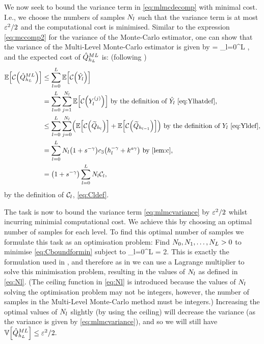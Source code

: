 We now seek to bound the variance term in \cref{eq:mlmcdecomp} with minimal cost. I.e., we choose the numbers of samples $N_{l}$ such that the variance term is at most $\varepsilon^2/2$ and the computational cost is minimised. Similar to the expression \cref{eq:mccomp2} for the variance of the Monte-Carlo estimator, one can show that the variance of the Multi-Level Monte-Carlo estimator is given by
\beq\label{eq:mlmcvariance}
\VAR{\QhatMLhL} = \sum_{l=0}^L \frac{\Vl}{\Nl},
\eeq
and the expected cost of $\hat{Q}^{ML}_{h_{L}}$ is: (following \cite{GrPaSc:19})
\begin{align}
\EXP{\Cost{\QhatMLhL}}&\leq \sum_{l=0}^L \EXP{\Cost{\Ylhat}}\nonumber\\
&= \sum_{l=0}^L \sum_{j=1}^{\Nl} \EXP{\Cost{\Ylj}}\text{ by the definition of } \Ylhat \text{ \cref{eq:Ylhatdef},}\nonumber\\
&\leq \sum_{l=0}^L \sum_{j=0}^{\Nl} \mleft(\EXP{\Cost{\Qhltilde}} + \EXP{\Cost{\Qhlmotilde}}\mright)\text{ by the definition of }\Yl \text{ \cref{eq:Yldef},}\nonumber\\
&=\sum_{l=0}^L \Nl\mleft(1+s^{-\gamma}\mright) \cth \mleft(\hl^{-\gamma}+k^{a\gamma}\mright) \text{ by \cref{lem:c},}\nonumber\\
&= \mleft(1+s^{-\gamma}\mright) \sum_{l=0}^L \Nl\Cl,\label{eq:Cboundformin}
\end{align}
by the definition of $\mathcal C_{l}$, \cref{eq:Cldef}.

The task is now to bound the variance term \cref{eq:mlmcvariance} by $\varepsilon^2/2$ whilst incurring minimial computational cost. We achieve this by choosing an optimal number of samples for each level. To find this optimal number of samples we formulate this task as an optimisation problem:
Find $N_{0},N_{1},\ldots,N_{L} > 0$ to minimise \cref{eq:Cboundformin} subject to
\beqs
\sum_{l=0}^L \frac{\Vl}{\Nl} = 2.
\eeqs
This is exactly the formulation used in \cite[Section 1.3]{Gi:15}, and therefore as in \cite[Section 1.3]{Gi:15} we can use a Lagrange multiplier to solve this minimisation problem, resulting in the values of $N_{l}$ as defined in \cref{eq:Nl}. (The ceiling function in \cref{eq:Nl} is introduced because the values of $N_{l}$ solving the optimisation problem may not be integers, however, the number of samples in the Multi-Level Monte-Carlo method must be integers.) Increasing the optimal values of $N_{l}$ slightly (by using the ceiling) will decrease the variance (as the variance is given by \cref{eq:mlmcvariance}), and so we will still have $\VAR{\QhatMLhL} \leq \eps^2/2.$

